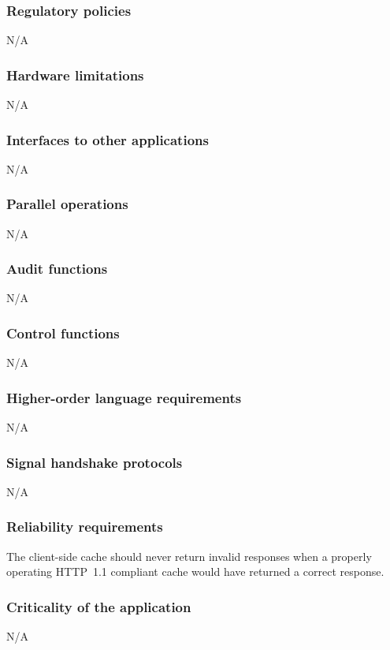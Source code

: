 \documentclass{article}
\begin{document}
\subsubsection{Regulatory policies}
N/A

\subsubsection{Hardware limitations}
N/A

\subsubsection{Interfaces to other applications}
N/A

\subsubsection{Parallel operations}
N/A 

\subsubsection{Audit functions}
N/A 

\subsubsection{Control functions}
N/A 

\subsubsection{Higher-order language requirements}
N/A 

\subsubsection{Signal handshake protocols}
N/A 

\subsubsection{Reliability requirements}
The client-side cache should never return invalid responses when a properly
operating HTTP~1.1 compliant cache would have returned a correct response.

\subsubsection{Criticality of the application}
N/A 
\end{document}
